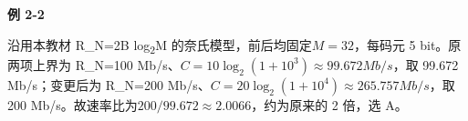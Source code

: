 {\color{ink}\bfseries 例 2-2}\par\vspace{1bp}沿用本教材 R\_N=\allowbreak{}2B log\textsubscript{2}M 的奈氏模型，前后均固定\(M=\allowbreak{}32\)，每码元 5 bit。原两项上界为 R\_N=\allowbreak{}100 Mb/\allowbreak{}s、\(C=\allowbreak{}10 \operatorname{log}_{2}(1+\allowbreak{}10^{3})\approx 99.672 Mb/\allowbreak{}s\)，取 99.672 Mb/\allowbreak{}s；变更后为 R\_N=\allowbreak{}200 Mb/\allowbreak{}s、\(C=\allowbreak{}20 \operatorname{log}_{2}(1+\allowbreak{}10^{4})\approx 265.757 Mb/\allowbreak{}s\)，取 200 Mb/\allowbreak{}s。故速率比为\(200/\allowbreak{}99.672\approx 2.0066\)，约为原来的 2 倍，选 A。
